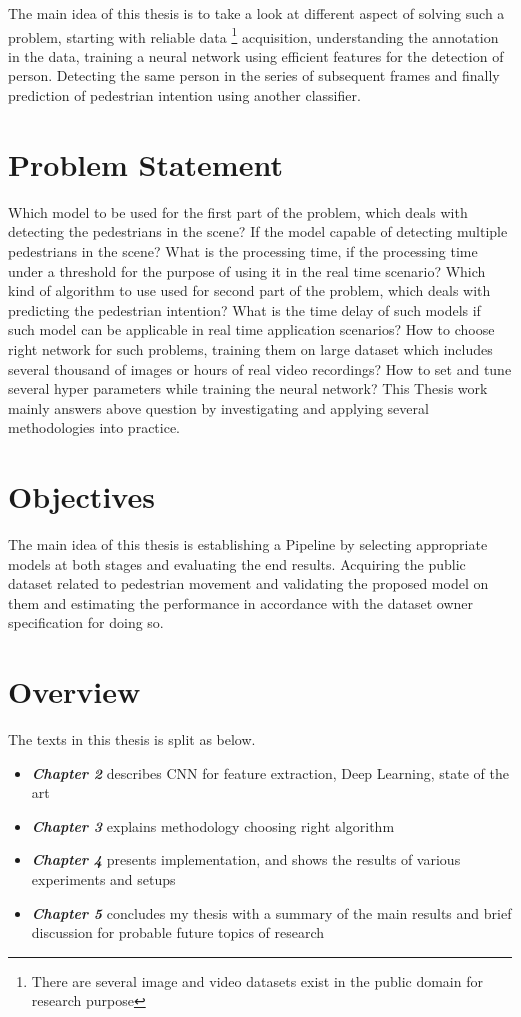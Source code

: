 \vspace{1em}
\noindent The main idea of this thesis is to take a look at different aspect of solving such a problem, 
starting with reliable data \footnote{There are several image and video datasets exist in the 
public domain for research purpose} acquisition, understanding the annotation in the data, 
training a neural network using efficient features for the detection of person. Detecting the same person in the series of subsequent frames and finally prediction of pedestrian intention using another classifier.

\section{Problem Statement} 
Which model to be used for the first part of the problem, which deals with detecting the pedestrians in the scene? If the model capable of detecting multiple pedestrians in the scene? What is the processing time, if the processing time under a threshold for the purpose of using it in the real time scenario?
Which kind of algorithm to use used for second part of the problem, which deals with predicting the pedestrian intention? What is the time delay of such models if such model can be applicable in real time application scenarios?
How to choose right network for such problems, training them on large dataset which includes several thousand of images or hours of real video recordings? How to set and tune several hyper parameters while training the neural network? This Thesis work mainly answers above question by investigating and  applying several methodologies into practice.

\section{Objectives}
The main idea of this thesis is establishing a Pipeline by selecting appropriate models at both stages and evaluating the end results. Acquiring the public dataset related to pedestrian movement and validating the proposed model on them and estimating the performance in accordance with the dataset owner specification for doing so.

\section{Overview}
The texts in this thesis is split as below.
\begin{itemize}
  \item {\textbf {\textit{Chapter 2}} describes CNN for feature extraction, Deep Learning, state of the art}
  \item {\textbf {\textit{Chapter 3}} explains methodology choosing right algorithm}
	\item {\textbf {\textit{Chapter 4}} presents implementation, and shows the results of various experiments and setups  }
	\item {\textbf {\textit{Chapter 5}} concludes my thesis with a summary of the main results and brief discussion for probable future topics of research}
\end{itemize}

